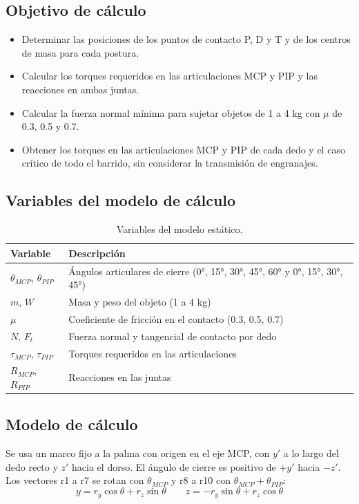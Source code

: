 \documentclass[11pt,letterpaper]{article}
\newcommand{\eq}[1]{{\boldmath\begin{equation*}#1\end{equation*}}}
\begin{document}
\subsection{Objetivo de cálculo}
\begin{itemize}
\item Determinar las posiciones de los puntos de contacto P, D y T y de los centros de masa para cada postura.
\item Calcular los torques requeridos en las articulaciones MCP y PIP y las reacciones en ambas juntas.
\item Calcular la fuerza normal mínima para sujetar objetos de 1 a 4 kg con $\mu$ de 0.3, 0.5 y 0.7.
\item Obtener los torques en las articulaciones MCP y PIP de cada dedo y el caso crítico de todo el barrido, sin considerar la transmisión de engranajes.
\end{itemize}

\subsection{Variables del modelo de cálculo}
\begin{table}[H]
\centering
\begin{tabular}{|l|l|}
\hline
\textbf{Variable} & \textbf{Descripción} \\ \hline
$\theta_{MCP}$, $\theta_{PIP}$ & Ángulos articulares de cierre (0°, 15°, 30°, 45°, 60° y 0°, 15°, 30°, 45°) \\ \hline
$m$, $W$ & Masa y peso del objeto (1 a 4 kg) \\ \hline
$\mu$ & Coeficiente de fricción en el contacto (0.3, 0.5, 0.7) \\ \hline
$N$, $F_t$ & Fuerza normal y tangencial de contacto por dedo \\ \hline
$\tau_{MCP}$, $\tau_{PIP}$ & Torques requeridos en las articulaciones \\ \hline
$R_{MCP}$, $R_{PIP}$ & Reacciones en las juntas \\ \hline
\end{tabular}
\caption{Variables del modelo estático.}
\label{tab:varest}
\end{table}

\subsection{Modelo de cálculo}
Se usa un marco fijo a la palma con origen en el eje MCP, con $y'$ a lo largo del dedo recto y $z'$ hacia el dorso. El ángulo de cierre es positivo de $+y'$ hacia $-z'$. Los vectores r1 a r7 se rotan con $\theta_{MCP}$ y r8 a r10 con $\theta_{MCP}+\theta_{PIP}$:
\eq{y = r_y\cos\theta + r_z\sin\theta \qquad z = -r_y\sin\theta + r_z\cos\theta}
\end{document}
